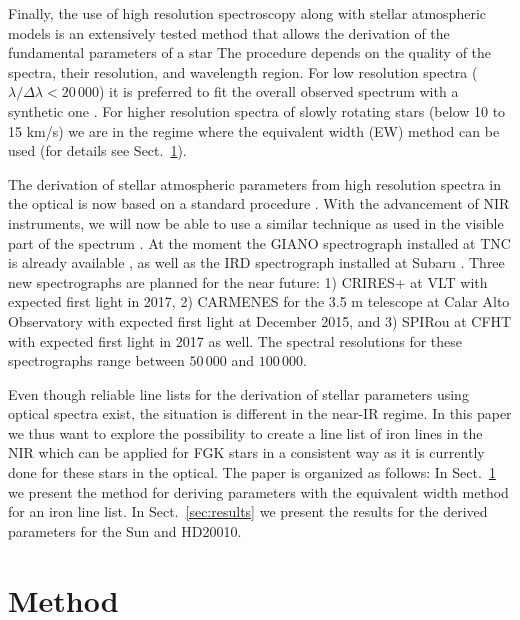 \documentclass{aa}
\begin{document}
Finally, the use of high resolution spectroscopy along with stellar
atmospheric models is an extensively tested method that allows
the derivation of the fundamental parameters of a star \citep[see
e.g.][]{Santos13} The procedure depends on the quality of the spectra,
their resolution, and wavelength region. For low resolution spectra
($\lambda/\Delta\lambda < 20\,000$) it is preferred to fit the overall
observed spectrum with a synthetic one \citep[see e.g.][]{Recio2006}.
For higher resolution spectra of slowly rotating stars (below 10 to 15
\si{km/s}) we are in the regime where the equivalent width (EW) method
can be used (for details see Sect.~\ref{sec:method}).

The derivation of stellar atmospheric parameters from high resolution
spectra in the optical is now based on a standard procedure \citep[see
e.g.][]{Valenti2005,Sousa2008a}. With the advancement of NIR
instruments, we will now be able to use a similar technique as used in the
visible part of the spectrum \citep[see e.g.][]{Melendez1999,Tsantaki2013,Sousa2008a,Bensby2014,Mucciarelli2013}.
At the moment the GIANO spectrograph installed at TNC is already
available \citep{GIANO}, as well as the IRD spectrograph installed
at Subaru \citep{IRD}. Three new spectrographs
are planned for the near future: 1) CRIRES+ at
VLT \citep{CRIRESp} with expected first light in 2017, 2) CARMENES
for the 3.5 m telescope at Calar Alto Observatory \citep{CARMENES}
with expected first light at December 2015, and 3) SPIRou at
CFHT \citep{SPIROU1,SPIROU2} with
expected first light in 2017 as well. The spectral resolutions for these
spectrographs range between $50\,000$ and $100\,000$.

Even though reliable line lists for the derivation of stellar parameters
using optical spectra exist, the situation is different in the near-IR
regime. In this paper we thus want to explore the possibility to create
a line list of iron lines in the NIR which can be applied for FGK stars
in a consistent way as it is currently done for these stars in the
optical. The paper is organized as follows: In Sect.~\ref{sec:method}
we present the method for deriving parameters with the equivalent width
method for an iron line list. In Sect.~\ref{sec:results} we present the
results for the derived parameters for the Sun and HD20010.




\section{Method}
\label{sec:method}
\end{document}
